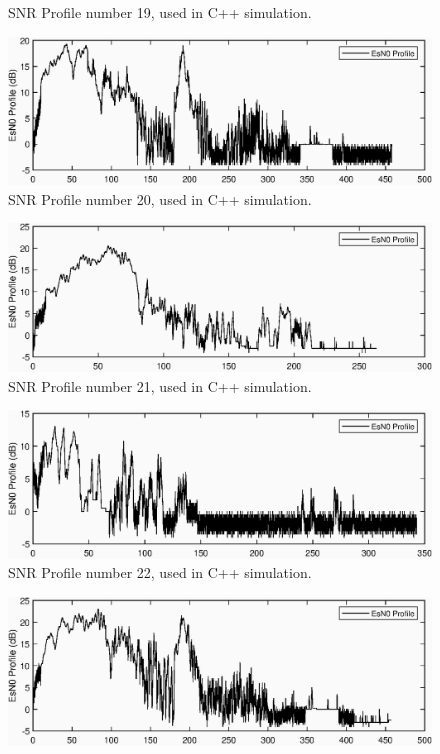 \begin{appendices}
\begin{figure}[ht!]
\caption{SNR Profile number 19, used in C++ simulation.}
\end{figure}
\begin{figure}[ht!]
\includegraphics{figures/c_sim_snr/EsNo_profile_20.eps}
\caption{SNR Profile number 20, used in C++ simulation.}
\end{figure}
\begin{figure}[ht!]
\includegraphics{figures/c_sim_snr/EsNo_profile_21.eps}
\caption{SNR Profile number 21, used in C++ simulation.}
\end{figure}
\begin{figure}[ht!]
\includegraphics{figures/c_sim_snr/EsNo_profile_22.eps}
\caption{SNR Profile number 22, used in C++ simulation.}
\end{figure}
\begin{figure}[ht!]
\includegraphics{figures/c_sim_snr/EsNo_profile_23.eps}

\end{figure}
\end{appendices}
